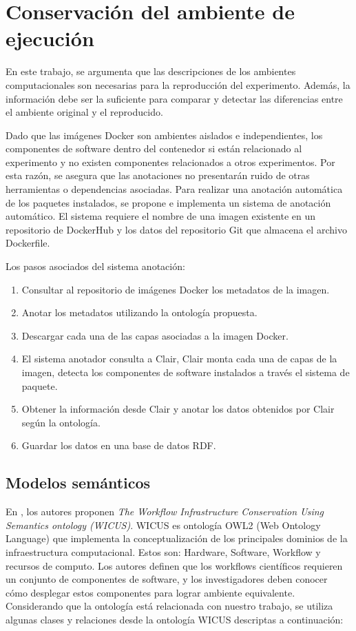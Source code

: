 \chapter{Conservación del ambiente de ejecución}

En este trabajo, se argumenta que las descripciones de los ambientes computacionales son necesarias para la reproducción del experimento. Además, la información debe ser la suficiente para comparar y detectar las diferencias entre el ambiente original y el reproducido.

Dado que las imágenes Docker son ambientes aislados e independientes, los componentes de software dentro del contenedor si están relacionado al experimento y no existen componentes relacionados a otros experimentos.
Por esta razón, se asegura que las anotaciones no presentarán ruido de otras herramientas o dependencias asociadas.
Para realizar una anotación automática de los paquetes instalados, se propone e implementa un sistema de anotación automático. El sistema requiere el nombre de una imagen existente en un repositorio de DockerHub y los datos del repositorio Git que almacena el archivo Dockerfile. 

Los pasos asociados del sistema anotación:
\begin{enumerate}
	\item Consultar al repositorio de imágenes Docker los metadatos de la imagen. 
	\item Anotar los metadatos utilizando la ontología propuesta.
	\item Descargar cada una de las capas asociadas a la imagen Docker.
	\item El sistema anotador consulta a Clair, Clair monta cada una de capas de la imagen, detecta los componentes de software instalados a través el sistema de paquete.
	\item Obtener la información desde Clair y anotar los datos obtenidos por Clair según la ontología.
	\item Guardar los datos en una base de datos RDF.
\end{enumerate} 

\section{Modelos semánticos}\label{s4.1}
     
En \cite{santana2017reproducibility}, los autores proponen \emph{The Workflow Infrastructure Conservation Using Semantics ontology (WICUS)}. WICUS es ontología OWL2 (Web Ontology Language) que implementa la conceptualización de los principales dominios de la infraestructura computacional. Estos son: Hardware, Software, Workflow y recursos de computo.
Los autores definen que los workflows científicos requieren un conjunto de componentes de software, y los investigadores deben conocer cómo desplegar estos componentes para lograr ambiente equivalente.
Considerando que la ontología está relacionada con nuestro trabajo, se utiliza algunas clases y relaciones desde la ontología WICUS descriptas a continuación:

